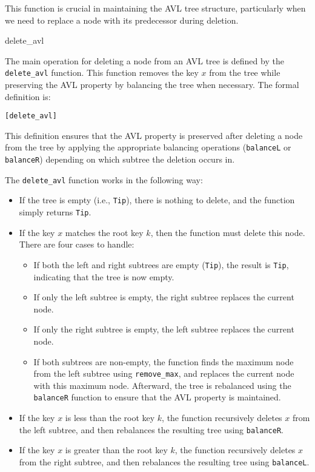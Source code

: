 This function is crucial in maintaining the AVL tree structure, particularly when we need to replace a node with its predecessor during deletion.

\begin{defn}{delete\_avl}

The main operation for deleting a node from an AVL tree is defined by the \texttt{delete\_avl} function. This function removes the key \( x \) from the tree while preserving the AVL property by balancing the tree when necessary. The formal definition is:


\begin{alltt}
	[delete_avl]
\end{alltt}

This definition ensures that the AVL property is preserved after deleting a node from the tree by applying the appropriate balancing operations (\texttt{balanceL} or \texttt{balanceR}) depending on which subtree the deletion occurs in.
\end{defn}


The \texttt{delete\_avl} function works in the following way:
\begin{itemize}
    \item If the tree is empty (i.e., \texttt{Tip}), there is nothing to delete, and the function simply returns \texttt{Tip}.
    \item If the key \( x \) matches the root key \( k \), then the function must delete this node. There are four cases to handle:
    \begin{itemize}
        \item If both the left and right subtrees are empty (\texttt{Tip}), the result is \texttt{Tip}, indicating that the tree is now empty.
        \item If only the left subtree is empty, the right subtree replaces the current node.
        \item If only the right subtree is empty, the left subtree replaces the current node.
        \item If both subtrees are non-empty, the function finds the maximum node from the left subtree using \texttt{remove\_max}, and replaces the current node with this maximum node. Afterward, the tree is rebalanced using the \texttt{balanceR} function to ensure that the AVL property is maintained.
    \end{itemize}
    \item If the key \( x \) is less than the root key \( k \), the function recursively deletes \( x \) from the left subtree, and then rebalances the resulting tree using \texttt{balanceR}.
    \item If the key \( x \) is greater than the root key \( k \), the function recursively deletes \( x \) from the right subtree, and then rebalances the resulting tree using \texttt{balanceL}.
\end{itemize}

